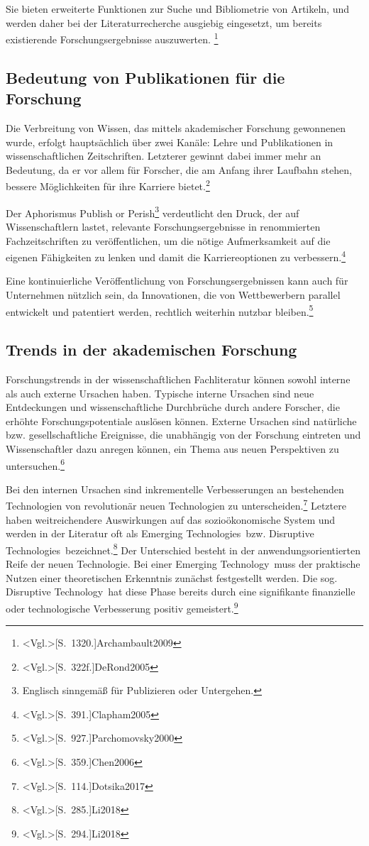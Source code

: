 Sie bieten erweiterte Funktionen zur Suche und Bibliometrie von Artikeln, und werden daher bei der Literaturrecherche ausgiebig eingesetzt, um bereits existierende Forschungsergebnisse auszuwerten. \footnote{\citeNP<Vgl.>[S.~1320.]{Archambault2009}}

\subsection{Bedeutung von Publikationen für die Forschung}
Die Verbreitung von Wissen, das mittels akademischer Forschung gewonnenen wurde, erfolgt hauptsächlich über zwei Kanäle: Lehre und Publikationen in wissenschaftlichen Zeitschriften. Letzterer gewinnt dabei immer mehr an Bedeutung, da er vor allem für Forscher, die am Anfang ihrer Laufbahn stehen, bessere Möglichkeiten für ihre Karriere bietet.\footnote{\citeNP<Vgl.>[S.~322f.]{DeRond2005}}

Der Aphorismus \glqq Publish or Perish\grqq\footnote{Englisch sinngemäß für \glqq Publizieren oder Untergehen\grqq.} verdeutlicht den Druck, der auf Wissenschaftlern lastet, relevante Forschungsergebnisse in renommierten Fachzeitschriften zu veröffentlichen, um die nötige Aufmerksamkeit auf die eigenen Fähigkeiten zu lenken und damit die Karriereoptionen zu verbessern.\footnote{\citeNP<Vgl.>[S.~391.]{Clapham2005}}

Eine kontinuierliche Veröffentlichung von Forschungsergebnissen kann auch für Unternehmen nützlich sein, da Innovationen, die von Wettbewerbern parallel entwickelt und patentiert werden, rechtlich weiterhin nutzbar bleiben.\footnote{\citeNP<Vgl.>[S.~927.]{Parchomovsky2000}}

\subsection{Trends in der akademischen Forschung}
Forschungstrends in der wissenschaftlichen Fachliteratur können sowohl interne als auch externe Ursachen haben. Typische interne Ursachen sind neue Entdeckungen und wissenschaftliche Durchbrüche durch andere Forscher, die erhöhte Forschungspotentiale auslösen können. Externe Ursachen sind natürliche bzw. gesellschaftliche Ereignisse, die unabhängig von der Forschung eintreten und Wissenschaftler dazu anregen können, ein Thema aus neuen Perspektiven zu untersuchen.\footnote{\citeNP<Vgl.>[S.~359.]{Chen2006}}

Bei den internen Ursachen sind inkrementelle Verbesserungen an bestehenden Technologien von revolutionär neuen Technologien zu unterscheiden.\footnote{\citeNP<Vgl.>[S.~114.]{Dotsika2017}} Letztere haben weitreichendere Auswirkungen auf das sozioökonomische System und werden in der Literatur oft als \glqq Emerging Technologies\grqq~bzw. \glqq Disruptive Technologies\grqq~bezeichnet.\footnote{\citeNP<Vgl.>[S.~285.]{Li2018}} Der Unterschied besteht in der anwendungsorientierten Reife der neuen Technologie. Bei einer \glqq Emerging Technology\grqq~muss der praktische Nutzen einer theoretischen Erkenntnis zunächst festgestellt werden. Die sog. \glqq Disruptive Technology\grqq~hat diese Phase bereits durch eine signifikante finanzielle oder technologische Verbesserung positiv gemeistert.\footnote{\citeNP<Vgl.>[S.~294.]{Li2018}}

